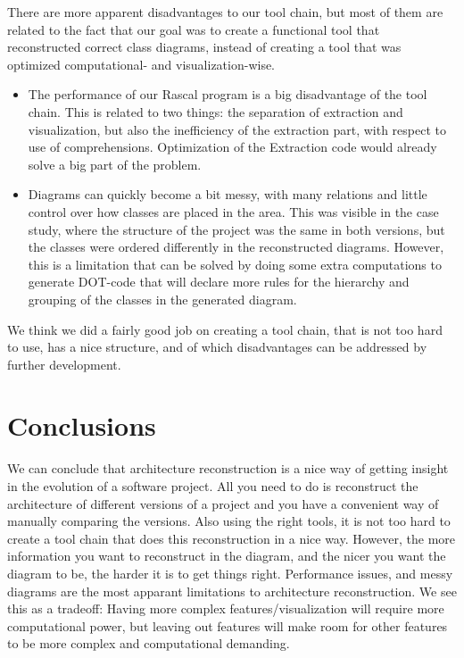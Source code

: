 \documentclass[a4paper,11pt]{article}
\begin{document}
		There are more apparent disadvantages to our tool chain, but most of them are related to the fact that our goal was to create a functional tool that reconstructed correct class diagrams, instead of creating a tool that was optimized computational- and visualization-wise.

		\begin{itemize}
			\item The performance of our Rascal program is a big disadvantage of the tool chain. This is related to two things: the separation of extraction and visualization, but also the inefficiency of the extraction part, with respect to use of comprehensions. Optimization of the Extraction code would already solve a big part of the problem.
			\item Diagrams can quickly become a bit messy, with many relations and little control over how classes are placed in the area. This was visible in the case study, where the structure of the project was the same in both versions, but the classes were ordered differently in the reconstructed diagrams. However, this is a limitation that can be solved by doing some extra computations to generate DOT-code that will declare more rules for the hierarchy and grouping of the classes in the generated diagram.
		\end{itemize}

		We think we did a fairly good job on creating a tool chain, that is not too hard to use, has a nice structure, and of which disadvantages can be addressed by further development.
	
	\section{Conclusions}
		We can conclude that architecture reconstruction is a nice way of getting insight in the evolution of a software project. All you need to do is reconstruct the architecture of different versions of a project and you have a convenient way of manually comparing the versions. Also using the right tools, it is not too hard to create a tool chain that does this reconstruction in a nice way. However, the more information you want to reconstruct in the diagram, and the nicer you want the diagram to be, the harder it is to get things right. Performance issues, and messy diagrams are the most apparant limitations to architecture reconstruction. We see this as a tradeoff: Having more complex features/visualization will require more computational power, but leaving out features will make room for other features to be more complex and computational demanding.
\end{document}
